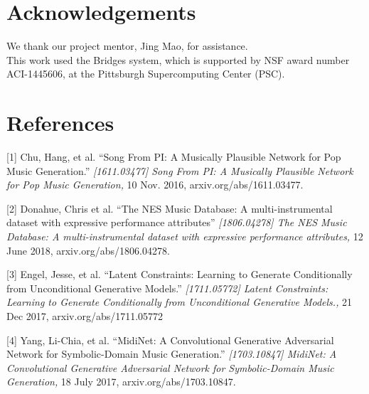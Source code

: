 \documentclass{article}
\begin{document}
\section{Acknowledgements}
We thank our project mentor, Jing Mao, for assistance.\\

This work used the Bridges system, which is supported by NSF award number ACI-1445606, at the Pittsburgh Supercomputing Center (PSC).

\section*{References}

\small

[1] Chu, Hang, et al. ``Song From PI: A Musically Plausible Network for Pop Music Generation.'' {\it [1611.03477] Song From PI: A Musically Plausible Network for Pop Music Generation,} 10 Nov. 2016, arxiv.org/abs/1611.03477.

[2] Donahue, Chris et al. ``The NES Music Database: A multi-instrumental dataset with expressive performance attributes'' {\it [1806.04278] The NES Music Database: A multi-instrumental dataset with expressive performance attributes,} 12 June 2018, arxiv.org/abs/1806.04278.

[3] Engel, Jesse, et al. ``Latent Constraints: Learning to Generate Conditionally from Unconditional Generative Models.'' {\it[1711.05772] Latent Constraints: Learning to Generate Conditionally from Unconditional Generative Models.,} 21 Dec 2017, arxiv.org/abs/1711.05772

[4] Yang, Li-Chia, et al. ``MidiNet: A Convolutional Generative Adversarial Network for Symbolic-Domain Music Generation.'' {\it[1703.10847] MidiNet: A Convolutional Generative Adversarial Network for Symbolic-Domain Music Generation,} 18 July 2017, arxiv.org/abs/1703.10847.
\end{document}
